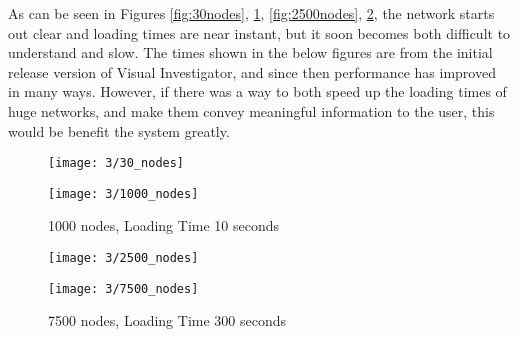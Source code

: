 \documentclass[../dissertation.tex]{subfiles}
\begin{document}
As can be seen in Figures \ref{fig:30nodes}, \ref{fig:1000nodes}, \ref{fig:2500nodes}, \ref{fig:7500nodes}, the network starts out clear and loading times are near instant, but it soon becomes both difficult to understand and slow. The times shown in the below figures are from the initial release version of Visual Investigator, and since then performance has improved in many ways. However, if there was a way to both speed up the loading times of huge networks, and make them convey meaningful information to the user, this would be benefit the system greatly.

\begin{figure}[H]
\centering
\begin{minipage}{.5\textwidth}
    \texttt{[image: 3/30\_nodes]}
    \caption{30 nodes, Loading Time less than 1 second}
    \label{fig:30nodes}
\end{minipage}%
\begin{minipage}{.5\textwidth}
    \texttt{[image: 3/1000\_nodes]}
    \caption{1000 nodes, Loading Time 10 seconds}
    \label{fig:1000nodes}
\end{minipage}
\end{figure}

\begin{figure}[H]
\centering
\begin{minipage}{.5\textwidth}
    \texttt{[image: 3/2500\_nodes]}
    \vspace*{3.5mm}
    \caption{2500 nodes, Loading Time 30 seconds}
    \label{fig:2500nodes}
\end{minipage}%
\begin{minipage}{.5\textwidth}
    \texttt{[image: 3/7500\_nodes]}
    \caption{7500 nodes, Loading Time 300 seconds}
    \label{fig:7500nodes}
\end{minipage}
\end{figure}
\end{document}
